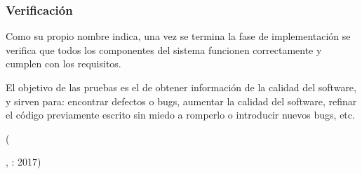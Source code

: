             \subsubsection{Verificación}
            \begin{center}
              \begin{minipage}{0.9\linewidth}
                \vspace{5pt}%
                {\small
                Como su propio nombre indica, una vez se termina la fase de implementación se verifica que todos los componentes del sistema funcionen correctamente y cumplen con los requisitos.

                El objetivo de las pruebas es el de obtener información de la calidad del software, y sirven para: encontrar defectos o bugs, aumentar la calidad del software, refinar el código previamente escrito sin miedo a romperlo o introducir nuevos bugs, etc.
                }
                \begin{flushright}
                  (\author{En qué consiste el modelo en cascada.},
                  : 2017)
                \end{flushright}
                  \vspace{5pt}%
              \end{minipage}
            \end{center}

